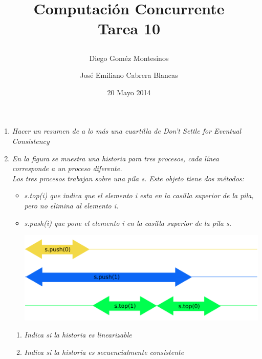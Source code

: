\documentclass{article}
\title{ Computación Concurrente \\ \Large{Tarea 10}
\author{
  Diego Goméz Montesinos
  \and
  José Emiliano Cabrera Blancas
  }
\date{20 Mayo 2014}
}
\begin{document}
\maketitle
\begin{enumerate}
  
\item{
    \textsl{
      Hacer un resumen de a lo más una cuartilla de Don't Settle for
      Eventual Consistency
    }
  }

\item{
    \textsl{
      En la figura se muestra una historia para tres procesos, cada
      línea corresponde a un proceso diferente.\\
      Los tres procesos trabajan sobre una pila s. Este objeto tiene
      dos métodos:
    }

    \begin{itemize}
    \item{\textsl{
          s.top(i) que indica que el elemento i esta en la casilla
          superior de la pila, pero no elimina al elemento i.
        }}
      
    \item{\textsl{
          s.push(i) que pone el elemento i en la casilla superior de la
          pila s.
    }
    
    \begin{centering}
      \includegraphics[scale=0.27]{figure1}
    \end{centering}
  }
\end{itemize}

\begin{enumerate}
  \item{\textsl{Indica si la historia es linearizable}}
  \item{\textsl{Indica si la historia es secuencialmente consistente}}
\end{enumerate}

}
\end{enumerate}
\end{document}

